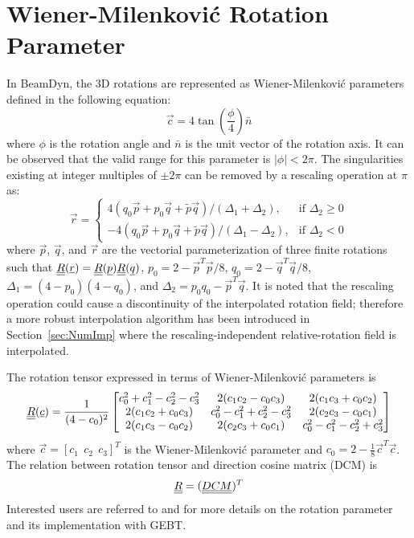 \section{Wiener-Milenkovi\'c Rotation Parameter}
In BeamDyn, the 3D rotations are represented as Wiener-Milenkovi\'c parameters defined in the following equation:
 \begin{equation}
     \vec{c} = 4 \tan\left(\frac{\phi}{4} \right) \bar{n} 
     \label{WMParameter}
 \end{equation}
where $\phi$ is the rotation angle and $\bar{n}$ is the unit vector of the rotation axis. 
It can be observed that the valid range for this parameter is $|\phi| < 2 \pi$. 
The singularities existing at integer multiples of $\pm 2 \pi$ can be removed by a rescaling operation at $\pi$ as:
\begin{equation}
    \label{RescaledWM}
    \vec{r} = \begin{cases}
    4(q_0\vec{p} + p_0 \vec{q} + \tilde{p} \vec{q} ) / (\Delta_1 + \Delta_2), & \text{if } \Delta_2 \geq 0 \\
    -4(q_0\vec{p} + p_0 \vec{q} + \tilde{p} \vec{q} ) / (\Delta_1 - \Delta_2), & \text{if } \Delta_2 < 0
    \end{cases}
\end{equation}
where $\vec{p}$, $\vec{q}$, and $\vec{r}$ are the vectorial parameterization of three finite rotations such that $\underline{\underline{R}}(\underline{r}) = \underline{\underline{R}}(\underline{p}) \underline{\underline{R}}(\underline{q})$, $p_0 = 2 - \vec{p}^T \vec{p}/8$, $q_0 = 2 - \vec{q}^T \vec{q}/8$, $\Delta_1 = (4-p_0)(4-q_0)$, and $\Delta_2 = p_0 q_0 - \vec{p}^T \vec{q}$.
It is noted that the rescaling operation could cause a discontinuity of the interpolated rotation field; therefore a more robust interpolation algorithm
has been introduced in Section~\ref{sec:NumImp} where the rescaling-independent relative-rotation field is interpolated. 

The rotation tensor expressed in terms of Wiener-Milenkovi\'c parameters is
\begin{equation}
   \label{eqn:RotTensorWM}
   \underline{\underline{R}} (\underline{c}) = \frac{1}{(4-c_0)^2}
   \begin{bmatrix}
    c_0^2 + c_1^2 - c_2^2 - c_3^2 & 2(c_1 c_2 - c_0 c_3) & 2(c_1 c_3 + c_0 c_2) \\
    2(c_1 c_2 + c_0 c_3) & c_0^2 - c_1^2 + c_2^2 - c_3^2 & 2(c_2 c_3 - c_0 c_1) \\
    2(c_1 c_3 - c_0 c_2)  & 2(c_2 c_3 + c_0 c_1) & c_0^2 - c_1^2 - c_2^2 + c_3^2 \\
    \end{bmatrix}
\end{equation}
where $\vec{c} = \left[ c_1~~c_2~~c_3\right]^T$ is the Wiener-Milenkovi\'c parameter and $c_0 = 2 - \frac{1}{8}\vec{c}^T \vec{c}$. 
The relation between rotation tensor and direction cosine matrix (DCM) is
\begin{equation}
    \label{RT2DCM}
    \underline{\underline{R}} = (\underline{\underline{DCM}})^T
\end{equation}
Interested users are referred to \cite{Bauchau-etal:2008} and \cite{Wang:GEBT2013} for more details on the rotation parameter and its implementation with GEBT.

